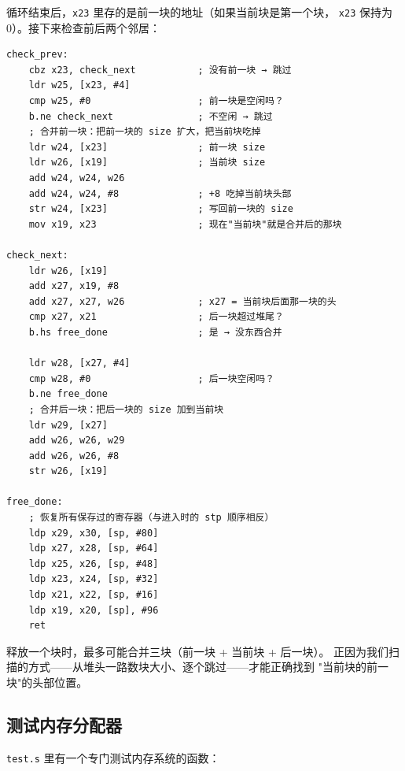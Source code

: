 循环结束后，\texttt{x23} 里存的是前一块的地址（如果当前块是第一个块，
\texttt{x23} 保持为 0）。接下来检查前后两个邻居：

\begin{lstlisting}[style=asm,caption=memoryfree.s — 合并相邻块]
check_prev:
    cbz x23, check_next           ; 没有前一块 → 跳过
    ldr w25, [x23, #4]
    cmp w25, #0                   ; 前一块是空闲吗？
    b.ne check_next               ; 不空闲 → 跳过
    ; 合并前一块：把前一块的 size 扩大，把当前块吃掉
    ldr w24, [x23]                ; 前一块 size
    ldr w26, [x19]                ; 当前块 size
    add w24, w24, w26
    add w24, w24, #8              ; +8 吃掉当前块头部
    str w24, [x23]                ; 写回前一块的 size
    mov x19, x23                  ; 现在"当前块"就是合并后的那块

check_next:
    ldr w26, [x19]
    add x27, x19, #8
    add x27, x27, w26             ; x27 = 当前块后面那一块的头
    cmp x27, x21                  ; 后一块超过堆尾？
    b.hs free_done                ; 是 → 没东西合并

    ldr w28, [x27, #4]
    cmp w28, #0                   ; 后一块空闲吗？
    b.ne free_done
    ; 合并后一块：把后一块的 size 加到当前块
    ldr w29, [x27]
    add w26, w26, w29
    add w26, w26, #8
    str w26, [x19]

free_done:
    ; 恢复所有保存过的寄存器（与进入时的 stp 顺序相反）
    ldp x29, x30, [sp, #80]
    ldp x27, x28, [sp, #64]
    ldp x25, x26, [sp, #48]
    ldp x23, x24, [sp, #32]
    ldp x21, x22, [sp, #16]
    ldp x19, x20, [sp], #96
    ret
\end{lstlisting}

释放一个块时，最多可能合并三块（前一块 + 当前块 + 后一块）。
正因为我们扫描的方式——从堆头一路数块大小、逐个跳过——才能正确找到
"当前块的前一块"的头部位置。

\subsection{测试内存分配器}

\texttt{test.s} 里有一个专门测试内存系统的函数：


